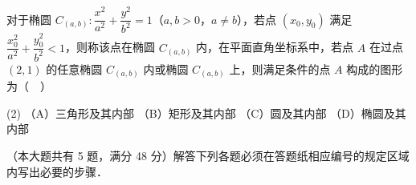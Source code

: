 \begin{question}
对于椭圆 \(C_{(a,b)}:\dfrac{x^{2}}{a^{2}}+\dfrac{y^{2}}{b^{2}}=1\)（\(a,b>0\)，\(a\neq b\)），若点 \((x_{0},y_{0})\) 满足 \(\dfrac{x_{0}^{2}}{a^{2}}+\dfrac{y_{0}^{2}}{b^{2}}<1\)，则称该点在椭圆 \(C_{(a,b)}\) 内，在平面直角坐标系中，若点 \(A\) 在过点 \((2,1)\) 的任意椭圆 \(C_{(a,b)}\) 内或椭圆 \(C_{(a,b)}\) 上，则满足条件的点 \(A\) 构成的图形为（　）

\begin{gkopts}(2)
\task （A）三角形及其内部
\task （B）矩形及其内部
\task （C）圆及其内部
\task （D）椭圆及其内部
\end{gkopts}

\end{question}

（本大题共有 5 题，满分 48 分）解答下列各题必须在答题纸相应编号的规定区域内写出必要的步骤．

